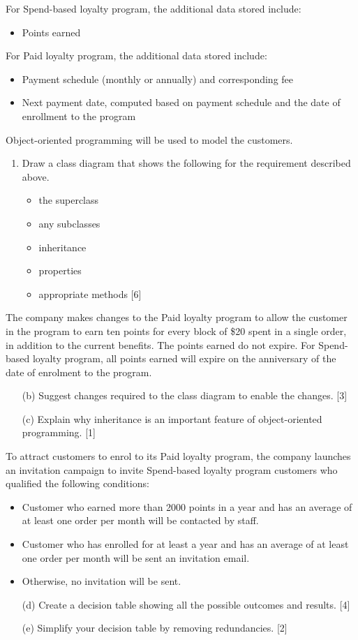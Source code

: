 For Spend-based loyalty program, the additional data stored include: 
\begin{itemize}
\item Points earned 
\end{itemize}
For Paid loyalty program, the additional data stored include: 
\begin{itemize}
\item Payment schedule (monthly or annually) and corresponding fee 
\item Next payment date, computed based on payment schedule and the date
of enrollment to the program 
\end{itemize}
Object-oriented programming will be used to model the customers. 
\begin{enumerate}
\item Draw a class diagram that shows the following for the requirement
described above.
\begin{itemize}
\item the superclass 
\item any subclasses 
\item inheritance 
\item properties 
\item appropriate methods \hfill{}{[}6{]}
\end{itemize}
\end{enumerate}
The company makes changes to the Paid loyalty program to allow the
customer in the program to earn ten points for every block of \$20
spent in a single order, in addition to the current benefits. The
points earned do not expire. For Spend- based loyalty program, all
points earned will expire on the anniversary of the date of enrolment
to the program. 
\begin{enumerate}
\item[(b)]  Suggest changes required to the class diagram to enable the changes.\hfill{}
{[}3{]}
\item[(c)]  Explain why inheritance is an important feature of object-oriented
programming.\hfill{} {[}1{]}
\end{enumerate}
To attract customers to enrol to its Paid loyalty program, the company
launches an invitation campaign to invite Spend-based loyalty program
customers who qualified the following conditions: 
\begin{itemize}
\item Customer who earned more than 2000 points in a year and has an average
of at least one order per month will be contacted by staff. 
\item Customer who has enrolled for at least a year and has an average of
at least one order per month will be sent an invitation email. 
\item Otherwise, no invitation will be sent. 
\end{itemize}
\begin{enumerate}
\item[(d)]  Create a decision table showing all the possible outcomes and results.
\hfill{}{[}4{]}
\item[(e)]  Simplify your decision table by removing redundancies.\hfill{}
{[}2{]}
\end{enumerate}